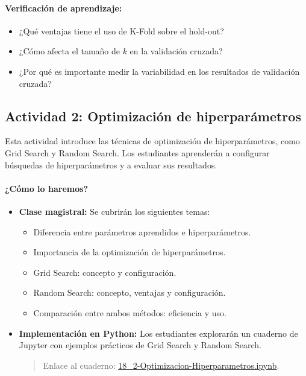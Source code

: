 \documentclass[a4,11pt]{aleph-notas}
\begin{document}
\paragraph{Verificación de aprendizaje:}  
\begin{itemize}[leftmargin=*]
    \item ¿Qué ventajas tiene el uso de K-Fold sobre el hold-out?
    \item ¿Cómo afecta el tamaño de \(k\) en la validación cruzada?
    \item ¿Por qué es importante medir la variabilidad en los resultados de validación cruzada?
\end{itemize}

\subsection*{Actividad 2: Optimización de hiperparámetros}

Esta actividad introduce las técnicas de optimización de hiperparámetros, como Grid Search y Random Search. Los estudiantes aprenderán a configurar búsquedas de hiperparámetros y a evaluar sus resultados.

\paragraph{¿Cómo lo haremos?}  
\begin{itemize}[leftmargin=*]
    \item \textbf{Clase magistral:} Se cubrirán los siguientes temas:
    \begin{itemize}
        \item Diferencia entre parámetros aprendidos e hiperparámetros.
        \item Importancia de la optimización de hiperparámetros.
        \item Grid Search: concepto y configuración.
        \item Random Search: concepto, ventajas y configuración.
        \item Comparación entre ambos métodos: eficiencia y uso.
    \end{itemize}
    \item \textbf{Implementación en Python:} Los estudiantes explorarán un cuaderno de Jupyter con ejemplos prácticos de Grid Search y Random Search.
    \begin{quote}
        Enlace al cuaderno: \href{https://colab.research.google.com/github/andres-merino/AprendizajeAutomaticoInicial-05-N0105/blob/main/2-Notebooks/18_2-Optimizacion-Hiperparametros.ipynb}{18\_2-Optimizacion-Hiperparametros.ipynb}.
    \end{quote}
\end{itemize}
\end{document}
